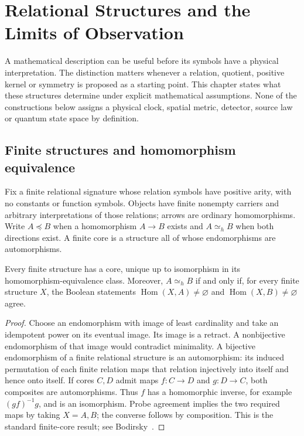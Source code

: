 \section{Relational Structures and the Limits of Observation}
\label{str:chapter}

A mathematical description can be useful before its symbols have a physical interpretation. The distinction matters whenever a relation, quotient, positive kernel or symmetry is proposed as a starting point. This chapter states what these structures determine under explicit mathematical assumptions. None of the constructions below assigns a physical clock, spatial metric, detector, source law or quantum state space by definition.

\subsection{Finite structures and homomorphism equivalence}
\label{str:cores}
Fix a finite relational signature whose relation symbols have positive arity, with no constants or function symbols. Objects have finite nonempty carriers and arbitrary interpretations of those relations; arrows are ordinary homomorphisms. Write $A\preceq B$ when a homomorphism $A\to B$ exists and $A\simeq_h B$ when both directions exist. A finite core is a structure all of whose endomorphisms are automorphisms.

\begin{proposition}
Every finite structure has a core, unique up to isomorphism in its homomorphism-equivalence class. Moreover, $A\simeq_h B$ if and only if, for every finite structure $X$, the Boolean statements $\operatorname{Hom}(X,A)\ne\varnothing$ and $\operatorname{Hom}(X,B)\ne\varnothing$ agree.
\end{proposition}
\begin{proof}
Choose an endomorphism with image of least cardinality and take an idempotent power on its eventual image. Its image is a retract. A nonbijective endomorphism of that image would contradict minimality. A bijective endomorphism of a finite relational structure is an automorphism: its induced permutation of each finite relation maps that relation injectively into itself and hence onto itself. If cores $C,D$ admit maps $f:C\to D$ and $g:D\to C$, both composites are automorphisms. Thus $f$ has a homomorphic inverse, for example $(gf)^{-1}g$, and is an isomorphism. Probe agreement implies the two required maps by taking $X=A,B$; the converse follows by composition. This is the standard finite-core result; see Bodirsky~\cite{bodirsky}.
\end{proof}

